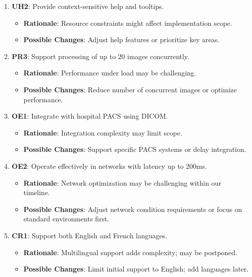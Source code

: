 \documentclass[12pt]{article}
\begin{document}
\begin{enumerate}[resume]
    \item \textbf{UH2}: Provide context-sensitive help and tooltips.
    \begin{itemize}[label=-]
        \item \textbf{Rationale}: Resource constraints might affect implementation scope.
        \item \textbf{Possible Changes}: Adjust help features or prioritize key areas.
    \end{itemize}

    \item \textbf{PR3}: Support processing of up to 20 images concurrently.
    \begin{itemize}[label=-]
        \item \textbf{Rationale}: Performance under load may be challenging.
        \item \textbf{Possible Changes}: Reduce number of concurrent images or optimize performance.
    \end{itemize}

    \item \textbf{OE1}: Integrate with hospital PACS using DICOM.
    \begin{itemize}[label=-]
        \item \textbf{Rationale}: Integration complexity may limit scope.
        \item \textbf{Possible Changes}: Support specific PACS systems or delay integration.
    \end{itemize}

    \item \textbf{OE2}: Operate effectively in networks with latency up to 200ms.
    \begin{itemize}[label=-]
        \item \textbf{Rationale}: Network optimization may be challenging within our timeline.
        \item \textbf{Possible Changes}: Adjust network condition requirements or focus on standard environments first.
    \end{itemize}

    \item \textbf{CR1}: Support both English and French languages.
    \begin{itemize}[label=-]
        \item \textbf{Rationale}: Multilingual support adds complexity; may be postponed.
        \item \textbf{Possible Changes}: Limit initial support to English; add languages later.
    \end{itemize}
\end{enumerate}
\end{document}
